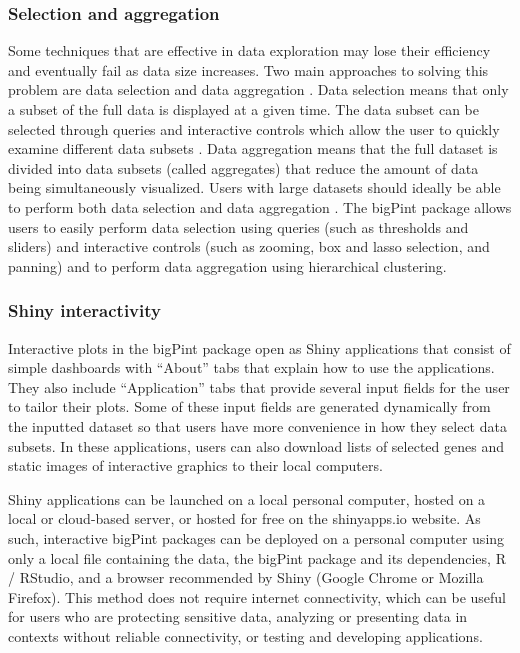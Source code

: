 \documentclass[parskip=full]{bmcart} %
\begin{document}
\subsubsection*{Selection and aggregation}

Some techniques that are effective in data exploration may lose their efficiency and eventually fail as data size increases. Two main approaches to solving this problem are data selection and data aggregation \cite{andrienko2005blending}. Data selection means that only a subset of the full data is displayed at a given time. The data subset can be selected through queries and interactive controls which allow the user to quickly examine different data subsets \cite{andrienko2005blending}. Data aggregation means that the full dataset is divided into data subsets (called aggregates) that reduce the amount of data being simultaneously visualized. Users with large datasets should ideally be able to perform both data selection and data aggregation \cite{andrienko2005blending}. The bigPint package allows users to easily perform data selection using queries (such as thresholds and sliders) and interactive controls (such as zooming, box and lasso selection, and panning) and to perform data aggregation using hierarchical clustering. 

\subsubsection*{Shiny interactivity}

Interactive plots in the bigPint package open as Shiny applications that consist of simple dashboards with ``About'' tabs that explain how to use the applications. They also include ``Application'' tabs that provide several input fields for the user to tailor their plots. Some of these input fields are generated dynamically from the inputted dataset so that users have more convenience in how they select data subsets. In these applications, users can also download lists of selected genes and static images of interactive graphics to their local computers. 

Shiny applications can be launched on a local personal computer, hosted on a local or cloud-based server, or hosted for free on the shinyapps.io website. As such, interactive bigPint packages can be deployed on a personal computer using only a local file containing the data, the bigPint package and its dependencies, R / RStudio, and a browser recommended by Shiny (Google Chrome or Mozilla Firefox). This method does not require internet connectivity, which can be useful for users who are protecting sensitive data, analyzing or presenting data in contexts without reliable connectivity, or testing and developing applications.
\end{document}
